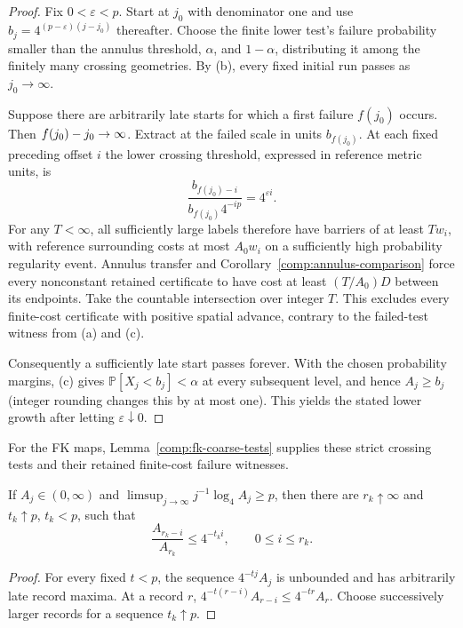 \begin{proof}
Fix $0<\varepsilon<p$.  Start at $j_0$ with denominator one and use
$b_j=4^{(p-\varepsilon)(j-j_0)}$ thereafter.  Choose the finite lower
test's failure probability smaller than the annulus threshold,
$\alpha$, and $1-\alpha$, distributing it among the finitely many crossing
geometries.  By (b), every fixed initial run passes as $j_0\to\infty$.

Suppose there are arbitrarily late starts for which a first failure
$f(j_0)$ occurs.  Then $f(j_0)-j_0\to\nobreak\infty$.  Extract at the failed
scale in units $b_{f(j_0)}$.  At each fixed preceding offset $i$ the
lower crossing threshold, expressed in reference metric units, is
\[
 \frac{b_{f(j_0)-i}}{b_{f(j_0)}4^{-ip}}
 =4^{\varepsilon i}.
\]
For any $T<\infty$, all sufficiently large labels therefore have
barriers of at least $Tw_i$, with reference surrounding costs at most
$A_0w_i$ on a sufficiently high probability regularity event.  Annulus
transfer and Corollary~\ref{comp:annulus-comparison} force every
nonconstant retained certificate to have cost at least $(T/A_0)D$
between its endpoints.  Take the countable intersection over integer
$T$.  This excludes every finite-cost certificate with positive spatial
advance, contrary to the failed-test witness from (a) and (c).

Consequently a sufficiently late start passes forever.  With the chosen
probability margins, (c) gives $\mathbb P[X_j<b_j]<\alpha$ at every
subsequent level, and hence $A_j\ge b_j$ (integer rounding changes this
by at most one).  This yields the stated lower growth after letting
$\varepsilon\downarrow0$.
\end{proof}

For the FK maps, Lemma~\ref{comp:fk-coarse-tests} supplies these strict
crossing tests and their retained finite-cost failure witnesses.

\begin{lemma}\label{comp:records}
If $A_j\in(0,\infty)$ and
$\limsup_{j\to\infty}j^{-1}\log_4 A_j\ge p$, then there are
$r_k\uparrow\infty$ and $t_k\uparrow p$, $t_k<p$, such that
\[
 \frac{A_{r_k-i}}{A_{r_k}}\le 4^{-t_k i},\qquad 0\le i\le r_k.
\]
\end{lemma}

\begin{proof}
For every fixed $t<p$, the sequence $4^{-tj}A_j$ is unbounded and has
arbitrarily late record maxima.  At a record $r$,
$4^{-t(r-i)}A_{r-i}\le4^{-tr}A_r$.  Choose successively larger records
for a sequence $t_k\uparrow p$.
\end{proof}

